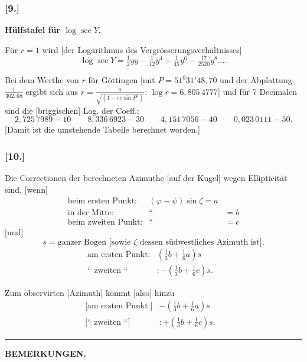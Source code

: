 \documentclass[12pt,a4paper]{article}
\theoremstyle{plain}
\theoremstyle{definition}
\theoremstyle{remark}
\newcommand{\ee}{\mathit{ee}}
\begin{document}
\subsubsection*{[9.]}
\textbf{Hülfstafel für $\log\sec Y$.}

Für $r = 1$ wird [der Logarithmus des Vergrösserungsverhältnisses]
\[
\log\sec Y = \tfrac{1}{2}yy - \tfrac{1}{12}y^4 + \tfrac{1}{45}y^6 - \tfrac{17}{2520}y^8 \ldots.
\]

Bei dem Werthe von $r$ für Göttingen [mit $P = 51^0 31' 48{,}70$ und der
Abplattung $\frac{1}{302{,}68}$ ergibt sich aus $r = \frac{a}{\sqrt{(1 - \ee\sin P^2)}}$: $\log r = 6{,}805\,4777$] und für
7 Decimalen sind die [briggischen] Log. der Coeff.:
\[
2{,}725\,7989 - 10 \qquad 8{,}336\,6923 - 30 \qquad 4{,}151\,7056 - 40 \qquad 0{,}023\,0111 - 50.
\]
[Damit ist die umstehende Tabelle berechnet worden.]

\subsubsection*{[10.]}
Die Correctionen der berechneten Azimuthe [auf der Kugel] wegen
Ellipticität sind, [wenn]
\[
\begin{array}{llr}
\text{beim ersten Punkt:} & (\varphi - \psi)\sin\zeta = a & \\
\text{in der Mitte:} & \text{``} &= b \\
\text{beim zweiten Punkt:} & \text{``} &= c
\end{array}
\]
[und]
\[
s = \text{ganzer Bogen [sowie $\zeta$ dessen südwestliches Azimuth ist],}
\]
\[
\begin{array}{llr}
\text{am ersten Punkt:} & (\tfrac{1}{3}b + \tfrac{1}{6}a)s & \\
\text{`` zweiten ``} & : -(\tfrac{1}{3}b + \tfrac{1}{6}c)s. &
\end{array}
\]

Zum observirten [Azimuth] kommt [also] hinzu
\[
\begin{array}{llr}
\text{[am ersten Punkt:]} & -(\tfrac{1}{3}b + \tfrac{1}{6}a)s & \\
\text{[`` zweiten ``]} & : +(\tfrac{1}{3}b + \tfrac{1}{6}c)s. &
\end{array}
\]

\bigskip
\begin{center}
\rule{0.4\textwidth}{0.4pt}
\end{center}
\bigskip

\begin{center}
\textbf{BEMERKUNGEN.}
\end{center}
\end{document}
